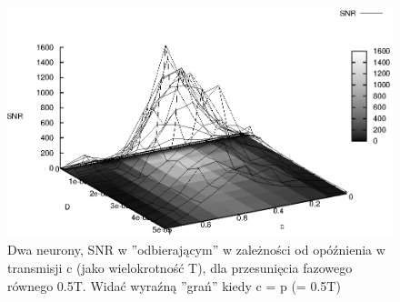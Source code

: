  \begin{figure}
    \includegraphics[width=140mm]{images/2neuron/3d}
    \caption{Dwa neurony, SNR w ''odbierającym'' w zależności od opóźnienia w transmisji c (jako wielokrotność T), dla przesunięcia fazowego równego 0.5T. Widać wyraźną ''grań'' kiedy c = p (= 0.5T)}
    \label{snr_c_d_3d}
  \end{figure}


